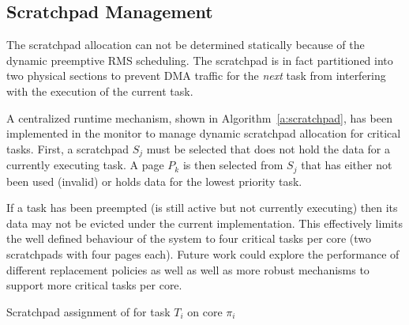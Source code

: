% 

\subsection{Scratchpad Management}

	The scratchpad allocation can not be determined statically because of the dynamic preemptive RMS scheduling. 
	The scratchpad is in fact partitioned into two physical sections to prevent DMA traffic for the \emph{next} task from interfering with the execution of the current task. 
	
	A centralized runtime mechanism, shown in Algorithm~\ref{a:scratchpad}, has been implemented in the monitor to manage dynamic scratchpad allocation for critical tasks.
	First, a scratchpad $S_j$ must be selected that does not hold the data for a currently executing task. 
	A page $P_k$ is then selected from $S_j$ that has either not been used (invalid) or holds data for the lowest priority task.

	If a task has been preempted (is still active but not currently executing) then its data may not be evicted under the current implementation.
	This effectively limits the well defined behaviour of the system to four critical tasks per core (two scratchpads with four pages each).
	Future work could explore the performance of different replacement policies as well as well as more robust mechanisms to support more critical tasks per core.
	
\begin{algorithm}
\caption{Scratchpad assignment of for task $T_i$ on core $\pi_i$}
\label{a:scratchpad}
\end{algorithm}

